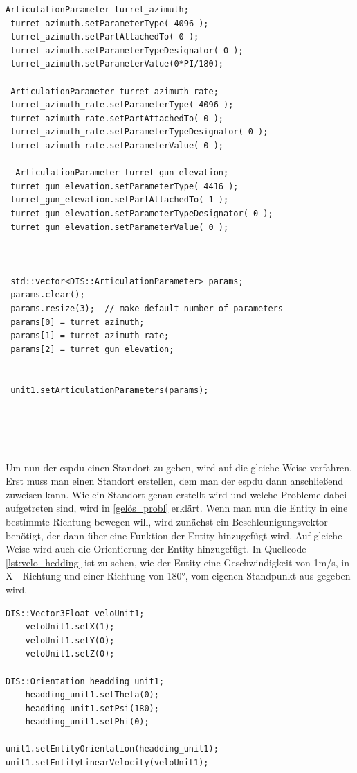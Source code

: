  \begin{lstlisting}[caption=Zusatz Teile,label={lst:att_parts}]
  ArticulationParameter turret_azimuth;
 turret_azimuth.setParameterType( 4096 );
 turret_azimuth.setPartAttachedTo( 0 );
 turret_azimuth.setParameterTypeDesignator( 0 );
 turret_azimuth.setParameterValue(0*PI/180);
 
 ArticulationParameter turret_azimuth_rate;
 turret_azimuth_rate.setParameterType( 4096 );
 turret_azimuth_rate.setPartAttachedTo( 0 );       
 turret_azimuth_rate.setParameterTypeDesignator( 0 );
 turret_azimuth_rate.setParameterValue( 0 );
 
  ArticulationParameter turret_gun_elevation;
 turret_gun_elevation.setParameterType( 4416 );
 turret_gun_elevation.setPartAttachedTo( 1 );            
 turret_gun_elevation.setParameterTypeDesignator( 0 );
 turret_gun_elevation.setParameterValue( 0 );

 
 
 std::vector<DIS::ArticulationParameter> params;
 params.clear();
 params.resize(3);  // make default number of parameters
 params[0] = turret_azimuth;
 params[1] = turret_azimuth_rate;
 params[2] = turret_gun_elevation;
 
 
 unit1.setArticulationParameters(params);
 
 
 
 
 \end{lstlisting}
 
 
Um nun der \ac{espdu} einen Standort zu geben, wird auf die gleiche Weise verfahren. Erst muss man einen Standort erstellen, dem man der \ac{espdu} dann anschließend zuweisen kann. Wie ein Standort genau erstellt wird und welche Probleme dabei aufgetreten sind, wird in  \ref{gelös_probl} erklärt. Wenn man nun die Entity in eine bestimmte Richtung bewegen will, wird zunächst ein Beschleunigungsvektor benötigt, der dann über eine Funktion der Entity hinzugefügt wird. Auf gleiche Weise wird auch die Orientierung der Entity hinzugefügt. In Quellcode \ref{lst:velo_hedding} ist zu sehen, wie der Entity eine Geschwindigkeit von 1m/s, in X - Richtung und einer Richtung von 180°, vom eigenen Standpunkt aus gegeben wird.

\begin{lstlisting}[caption = Beschleunigungs- und Orientierungsvektor,label={lst:velo_hedding}]
DIS::Vector3Float veloUnit1;
	veloUnit1.setX(1);
	veloUnit1.setY(0);
	veloUnit1.setZ(0);

DIS::Orientation headding_unit1;
	headding_unit1.setTheta(0);
	headding_unit1.setPsi(180);
	headding_unit1.setPhi(0);

unit1.setEntityOrientation(headding_unit1);
unit1.setEntityLinearVelocity(veloUnit1);
\end{lstlisting}

